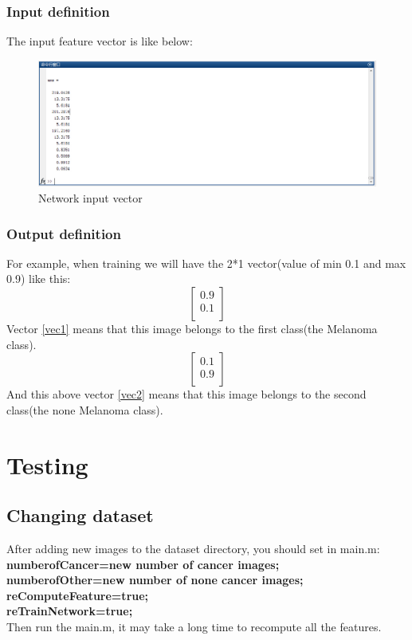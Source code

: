 \documentclass[14pt]{report} %
\begin{document}
\subsubsection{Input definition}
	The input feature vector is like below:
	\begin{figure}[H]
		\includegraphics[width=\textwidth]{image/inputfeaturevector.jpg} 
		\caption{Network input vector} 
		 \label{fig:networkInputFeatureVector} 
	\end{figure}
\subsubsection{Output definition}
	For example, when training we will have the 2*1 vector(value of min 0.1 and max 0.9) like this:
	\begin{equation}\label{vec1} \left[ \begin{array}{c} 0.9\\ 0.1\\ \end{array}\right]\end{equation}
	Vector \ref{vec1} means that this image belongs to the first class(the Melanoma class).
	\begin{equation} \label{vec2} \left[ \begin{array}{c} 0.1\\ 0.9\\ \end{array}\right]\end{equation}
	And this above vector \ref{vec2} means that this image belongs to the second class(the none Melanoma class).
\section{Testing}
	\subsection{Changing dataset}
	After adding new images to the dataset directory, you should set in main.m:\\
	\textbf{
	numberofCancer=new number of cancer images;
	\\numberofOther=new number of none cancer images;
	\\reComputeFeature=true;
	\\reTrainNetwork=true;
	}\\Then run the main.m, it may take a long time to recompute all the features.
\end{document}

